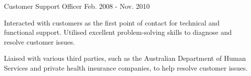 \begin{cventries}
  \cventry
    {Customer Support Officer} %
    {} %
    {} %
    {Feb. 2008 - Nov. 2010} %
    {
      \begin{cvitems} %
        \item {
          Interacted with customers as the first point of contact for technical and functional support. Utilised
          excellent problem-solving skills to diagnose and resolve customer issues.
        }
        \item {
          Liaised with various third parties, such as the Australian Department of Human Services and private health
          insurance companies, to help resolve customer issues.
        }
      \end{cvitems}
    }

\end{cventries}
